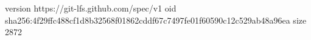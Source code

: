 version https://git-lfs.github.com/spec/v1
oid sha256:4f29ffc488cf1d8b32568f01862cddf67c7497fe01f60590c12c529ab48a96ea
size 2872
